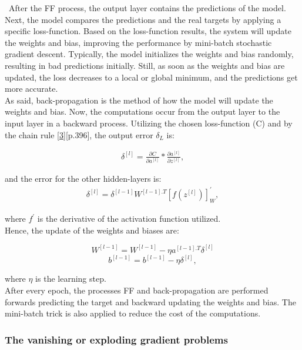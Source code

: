 \quad \, After the FF process, the output layer contains the predictions of the model. Next, the model compares the predictions and the real targets by applying a specific loss-function. Based on the loss-function results, the system will update the weights and bias, improving the performance by mini-batch stochastic gradient descent. Typically, the model initializes the weights and bias randomly, resulting in bad predictions initially. Still, as soon as the weights and bias are updated, the loss decreases to a local or global minimum, and the predictions get more accurate.\\

As said, back-propagation is the method of how the model will update the weights and bias. Now, the computations occur from the output layer to the input layer in a backward process. Utilizing the chosen loss-function (C) and by the chain rule \hyperref[Bib:Hands-on Machine Learning]{[3]}[p.396], the output error $\delta_L$ is:

\begin{align*}
\delta^{[l]} = \frac{\partial C}{\partial a^{[l]}} * \frac{\partial a^{[l]}}{\partial z^{[l]}},
\end{align*}

\noindent and the error for the other hidden-layers is:\\

\begin{align*}
\delta^{[l]} = \delta^{[l-1]} W^{[l-1].T} [f(z^{[l]})]_W^',
\end{align*}

\noindent where $f^'$ is the derivative of the activation function utilized.\\

Hence, the update of the weights and biases are:

$$W^{[l-1]} = W^{[l-1]} - \eta a^{[l-1].T} \delta^{[l]}$$
$$b^{[l-1]} = b^{[l-1]} - \eta \delta^{[l]},$$

\noindent where $\eta$ is the learning step.\\

After every epoch, the processes FF and back-propagation are performed forwards predicting the target and backward updating the weights and bias. The mini-batch trick is also applied to reduce the cost of the computations.

\subsubsection{The vanishing or exploding gradient problems}
\label{chap:The vanishing or exploding gradient problems}

